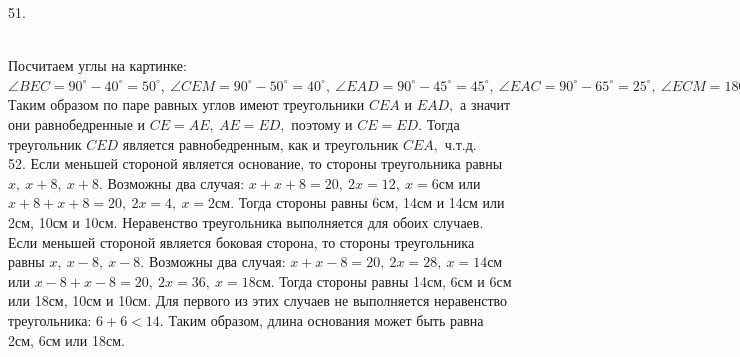 \documentclass[12pt]{article}
\begin{document}
51. \begin{figure}[ht!]
\end{figure}\\
Посчитаем углы на картинке: $\angle BEC=90^\circ-40^\circ=50^\circ,\ \angle CEM=90^\circ-50^\circ=40^\circ,\ \angle EAD=90^\circ-45^\circ=45^\circ,\ \angle EAC=90^\circ-65^\circ=25^\circ,\ \angle ECM=180^\circ-90^\circ-40^\circ-25^\circ=25^\circ.$ Таким образом по паре равных углов имеют треугольники $CEA$ и $EAD,$ а значит они равнобедренные и $CE=AE,\ AE=ED,$ поэтому и $CE=ED.$ Тогда треугольник $CED$ является равнобедренным, как и треугольник $CEA,$ ч.т.д.\\
52. Если меньшей стороной является основание, то стороны треугольника равны $x,\ x+8,\ x+8.$ Возможны два случая: $x+x+8=20,\ 2x=12,\ x=6$см или $x+8+x+8=20,\ 2x=4,\ x=2$см. Тогда стороны равны 6см, 14см и 14см или 2см, 10см и 10см. Неравенство треугольника выполняется для обоих случаев. Если меньшей стороной является боковая сторона, то стороны треугольника равны $x,\ x-8,\ x-8.$ Возможны два случая: $x+x-8=20,\ 2x=28,\ x=14$см или $x-8+x-8=20,\ 2x=36,\ x=18$см. Тогда стороны равны 14см, 6см и 6см или 18см, 10см и 10см. Для первого из этих случаев не выполняется неравенство треугольника: $6+6<14.$ Таким образом, длина основания может быть равна 2см, 6см или 18см.\\
\end{document}
